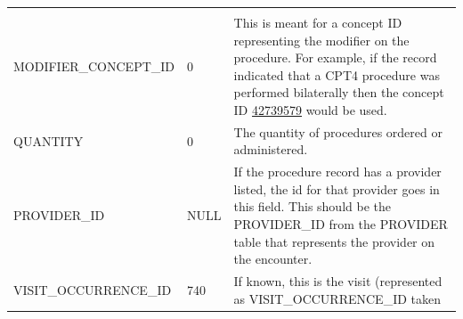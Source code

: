 \documentclass[11pt]{book}
\begin{document}
\begin{longtable}[]{@{}lll@{}}
\begin{minipage}[t]{0.46\columnwidth}
\end{minipage}\tabularnewline
\begin{minipage}[t]{0.36\columnwidth}\raggedright\strut
MODIFIER\_CONCEPT\_ID\strut
\end{minipage} & \begin{minipage}[t]{0.09\columnwidth}\raggedright\strut
0\strut
\end{minipage} & \begin{minipage}[t]{0.46\columnwidth}\raggedright\strut
This is meant for a concept ID representing the modifier on the
procedure. For example, if the record indicated that a CPT4 procedure
was performed bilaterally then the concept ID
\href{http://athena.ohdsi.org/search-terms/terms/42739579}{42739579}
would be used.\strut
\end{minipage}\tabularnewline
\begin{minipage}[t]{0.36\columnwidth}\raggedright\strut
QUANTITY\strut
\end{minipage} & \begin{minipage}[t]{0.09\columnwidth}\raggedright\strut
0\strut
\end{minipage} & \begin{minipage}[t]{0.46\columnwidth}\raggedright\strut
The quantity of procedures ordered or administered.\strut
\end{minipage}\tabularnewline
\begin{minipage}[t]{0.36\columnwidth}\raggedright\strut
PROVIDER\_ID\strut
\end{minipage} & \begin{minipage}[t]{0.09\columnwidth}\raggedright\strut
NULL\strut
\end{minipage} & \begin{minipage}[t]{0.46\columnwidth}\raggedright\strut
If the procedure record has a provider listed, the id for that provider
goes in this field. This should be the PROVIDER\_ID from the PROVIDER
table that represents the provider on the encounter.\strut
\end{minipage}\tabularnewline
\begin{minipage}[t]{0.36\columnwidth}\raggedright\strut
VISIT\_OCCURRENCE\_ID\strut
\end{minipage} & \begin{minipage}[t]{0.09\columnwidth}\raggedright\strut
740\strut
\end{minipage} & \begin{minipage}[t]{0.46\columnwidth}\raggedright\strut
If known, this is the visit (represented as VISIT\_OCCURRENCE\_ID taken

\end{minipage}
\end{longtable}
\end{document}
